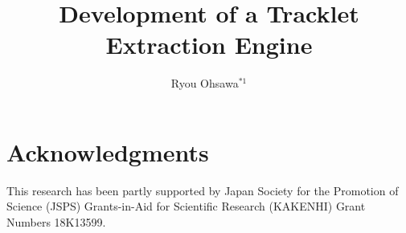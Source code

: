 \documentclass[11pt,a4paper,twocolumn]{article}
\title{Development of a Tracklet Extraction Engine}
\author[1]{Ryou Ohsawa$^{*1}$}
\begin{document}
\maketitle







\section*{Acknowledgments}
\label{sec:acknowledgments}
This research has been partly supported by Japan Society for the Promotion of Science (JSPS) Grants-in-Aid for Scientific Research (KAKENHI) Grant Numbers 18K13599.




\appendix


\renewcommand{\thefootnote}{\relax}
\end{document}
